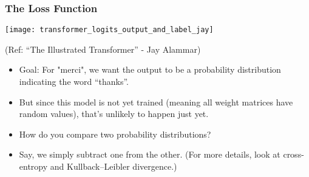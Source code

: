 \begin{frame}[fragile]\frametitle{The Loss Function}

\begin{center}
\texttt{[image: transformer\_logits\_output\_and\_label\_jay]}


{\tiny (Ref: ``The Illustrated Transformer'' - Jay Alammar)}
\end{center}		


\begin{itemize}
\item Goal: For "merci", we want the output to be a probability distribution indicating the word ``thanks''. 
\item But since this model is not yet trained (meaning all weight matrices have random values), that’s unlikely to happen just yet.
\end{itemize}

\begin{itemize}
\item How do you compare two probability distributions? 
\item Say, we simply subtract one from the other. (For more details, look at cross-entropy and Kullback–Leibler divergence.)
\end{itemize}


\end{frame}

